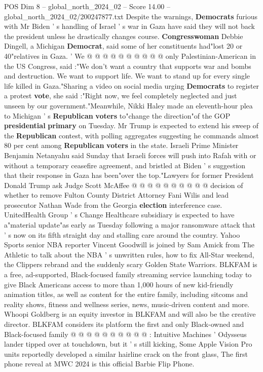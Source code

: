 \begin{textsample}{POS Dim 8 – global\_north\_2024\_02 – Score 14.00 – global\_north\_2024\_02/200247877.txt}
Despite the warnings, \textbf{Democrats} furious with Mr Biden ' s handling of Israel ' s war in Gaza have said they will not back the president unless he drastically changes course. \textbf{Congresswoman} Debbie Dingell, a Michigan \textbf{Democrat}, said some of her constituents had"lost 20 or 40"relatives in Gaza. ' We @ @ @ @ @ @ @ @ @ @ only Palestinian-American in the US Congress, said :"We don't want a country that supports war and bombs and destruction.
We want to support life.
We want to stand up for every single life killed in Gaza."Sharing a video on social media urging \textbf{Democrats} to register a protest \textbf{vote}, she said :"Right now, we feel completely neglected and just unseen by our government."Meanwhile, Nikki Haley made an eleventh-hour plea to Michigan ' s \textbf{Republican} \textbf{voters} to"change the direction"of the GOP \textbf{presidential} \textbf{primary} on Tuesday.
Mr Trump is expected to extend his sweep of the \textbf{Republican} contest, with polling aggregates suggesting he commands almost 80 per cent among \textbf{Republican} \textbf{voters} in the state.
Israeli Prime Minister Benjamin Netanyahu said Sunday that Israeli forces will push into Rafah with or without a temporary ceasefire agreement, and bristled at Biden ' s suggestion that their response in Gaza has been"over the top."Lawyers for former President Donald Trump ask Judge Scott McAffee @ @ @ @ @ @ @ @ @ @ decision of whether to remove Fulton County District Attorney Fani Wilis and lead prosecutor Nathan Wade from the Georgia \textbf{election} interference case.
UnitedHealth Group ' s Change Healthcare subsidiary is expected to have a"material update"as early as Tuesday following a major ransomware attack that ' s now on its fifth straight day and stalling care around the country.
Yahoo Sports senior NBA reporter Vincent Goodwill is joined by Sam Amick from The Athletic to talk about the NBA ' s unwritten rules, how to fix All-Star weekend, the Clippers rebrand and the suddenly scary Golden State Warriors.
BLKFAM is a free, ad-supported, Black-focused family streaming service launching today to give Black Americans access to more than 1,000 hours of new kid-friendly animation titles, as well as content for the entire family, including sitcoms and reality shows, fitness and wellness series, news, music-driven content and more.
Whoopi Goldberg is an equity investor in BLKFAM and will also be the creative director.
BLKFAM considers its platform the first and only Black-owned and Black-focused family @ @ @ @ @ @ @ @ @ @ : Intuitive Machines ' Odysseus lander tipped over at touchdown, but it ' s still kicking, Some Apple Vision Pro units reportedly developed a similar hairline crack on the front glass, The first phone reveal at MWC 2024 is this official Barbie Flip Phone.

\end{textsample}
